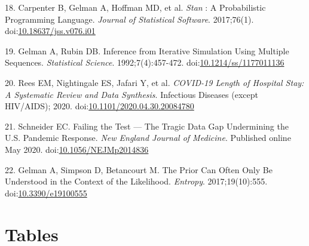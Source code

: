 \documentclass[
]{article}
\begin{document}
\leavevmode\hypertarget{ref-carpenter_stan_2017}{}%
18. Carpenter B, Gelman A, Hoffman MD, et al. \emph{Stan} : A Probabilistic Programming Language. \emph{Journal of Statistical Software}. 2017;76(1). doi:\href{https://doi.org/10.18637/jss.v076.i01}{10.18637/jss.v076.i01}

\leavevmode\hypertarget{ref-gelman_inference_1992}{}%
19. Gelman A, Rubin DB. Inference from Iterative Simulation Using Multiple Sequences. \emph{Statistical Science}. 1992;7(4):457-472. doi:\href{https://doi.org/10.1214/ss/1177011136}{10.1214/ss/1177011136}

\leavevmode\hypertarget{ref-rees_covid-19_2020}{}%
20. Rees EM, Nightingale ES, Jafari Y, et al. \emph{COVID-19 Length of Hospital Stay: A Systematic Review and Data Synthesis}. Infectious Diseases (except HIV/AIDS); 2020. doi:\href{https://doi.org/10.1101/2020.04.30.20084780}{10.1101/2020.04.30.20084780}

\leavevmode\hypertarget{ref-schneider_failing_2020}{}%
21. Schneider EC. Failing the Test --- The Tragic Data Gap Undermining the U.S. Pandemic Response. \emph{New England Journal of Medicine}. Published online May 2020. doi:\href{https://doi.org/10.1056/NEJMp2014836}{10.1056/NEJMp2014836}

\leavevmode\hypertarget{ref-gelman_prior_2017}{}%
22. Gelman A, Simpson D, Betancourt M. The Prior Can Often Only Be Understood in the Context of the Likelihood. \emph{Entropy}. 2017;19(10):555. doi:\href{https://doi.org/10.3390/e19100555}{10.3390/e19100555}

\newpage

\FloatBarrier

\hypertarget{tables}{%
\section{Tables}\label{tables}}
\end{document}
